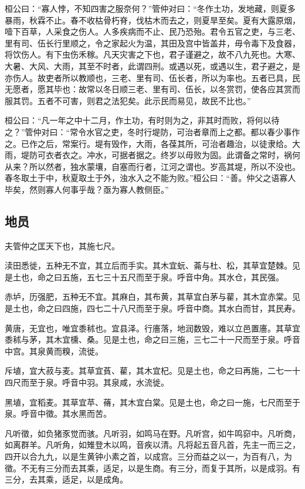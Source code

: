 \documentclass[]{article}
\begin{document}
桓公曰：``寡人悖，不知四害之服奈何？''管仲对曰：``冬作土功，发地藏，则夏多暴雨，秋霖不止。春不收枯骨朽脊，伐枯木而去之，则夏旱至矣。夏有大露原烟，噎下百草，人采食之伤人。人多疾病而不止、民乃恐殆。君令五官之吏，与三老、里有司、伍长行里顺之，令之家起火为温，其田及宫中皆盖井，毋令毒下及食器，将饮伤人。有下虫伤禾稼。凡天灾害之下也，君子谨避之，故不八九死也。大寒、大暑、大风、大雨，其至不时者，此谓四刑。或遇以死，或遇以生，君子避之，是亦伤人。故吏者所以教顺也，三老、里有司、伍长者，所以为率也。五者已具，民无愿者，愿其毕也：故常以冬日顺三老、里有司、伍长，以冬赏罚，使各应其赏而服其罚。五者不可害，则君之法犯矣。此示民而易见，故民不比也。''

桓公曰：``凡一年之中十二月，作土功，有时则为之，非其时而败，将何以待之？''管仲对曰：``常令水官之吏，冬时行堤防，可治者章而上之都。都以春少事作之。已作之后，常案行。堤有毁作，大雨，各葆其所，可治者趣治，以徒隶给。大雨，堤防可衣者衣之。冲水，可据者据之。终岁以毋败为固。此谓备之常时，祸何从来？所以然者，独水蒙壤，自塞而行者，江河之谓也。岁高其堤，所以不没也。春冬取土于中，秋夏取土于外，浊水入之不能为败。''桓公曰：``善。仲父之语寡人毕矣，然则寡人何事乎哉？亟为寡人教侧臣。''

\hypertarget{header-n743}{%
\subsection{地员}\label{header-n743}}

夫管仲之匡天下也，其施七尺。

渎田悉徙，五种无不宜，其立后而手实。其木宜蚖、菕与杜、松，其草宜楚棘。见是土也，命之曰五施，五七三十五尺而至于泉。呼音中角。其水仓，其民强。

赤垆，历强肥，五种无不宜。其麻白，其布黄，其草宜白茅与雚，其木宜赤棠。见是土也，命之曰四施，四七二十八尺而至于泉。呼音中商。其水白而甘，其民寿。

黄唐，无宜也，唯宜黍秫也。宜县泽。行廧落，地润数毁，难以立邑置廧。其草宜黍秫与茅，其木宜櫄、桑。见是土也，命之曰三施，三七二十一尺而至于泉。呼音中宫。其泉黄而糗，流徙。

斥埴，宜大菽与麦。其草宜萯、雚，其木宜杞。见是土也，命之曰再施，二七一十四尺而至于泉。呼音中羽。其泉咸，水流徙。

黑埴，宜稻麦。其草宜苹、蓨，其木宜白棠。见是土也，命之曰一施，七尺而至于泉。呼音中徵。其水黑而苦。

凡听徵，如负猪豕觉而骇。凡听羽，如鸣马在野。凡听宫，如牛鸣窌中。凡听商，如离群羊。凡听角，如雉登木以鸣，音疾以清。凡将起五音凡首，先主一而三之，四开以合九九，以是生黄钟小素之首，以成宫。三分而益之以一，为百有八，为徵。不无有三分而去其乘，适足，以是生商。有三分，而复于其所，以是成羽。有三分，去其乘，适足，以是成角。
\end{document}

